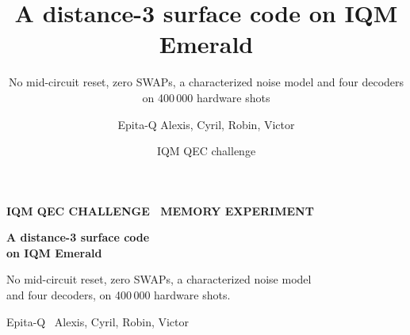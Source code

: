 \documentclass[aspectratio=169,11pt]{beamer}
\title{A distance-3 surface code on IQM Emerald}
\subtitle{No mid-circuit reset, zero SWAPs, a characterized noise model and four decoders on 400\,000 hardware shots}
\author{Epita-Q \quad Alexis, Cyril, Robin, Victor}
\date{IQM QEC challenge}
\begin{document}
{
\begin{frame}[plain]
  \color{paper}\vfill
  {\color{accent!80!white}\scriptsize\bfseries IQM QEC CHALLENGE \textperiodcentered\ MEMORY EXPERIMENT}\par\medskip
  {\Huge\bfseries A distance-3 surface code\\[2pt] on IQM Emerald}\par\bigskip
  {\large\color{panel} No mid-circuit reset, zero SWAPs, a characterized noise model\\ and four decoders, on 400\,000 hardware shots.}\par\vfill
  {\small\color{panel} Epita-Q \textperiodcentered\ Alexis, Cyril, Robin, Victor}
  \vspace*{1em}
\end{frame}}
\end{document}
